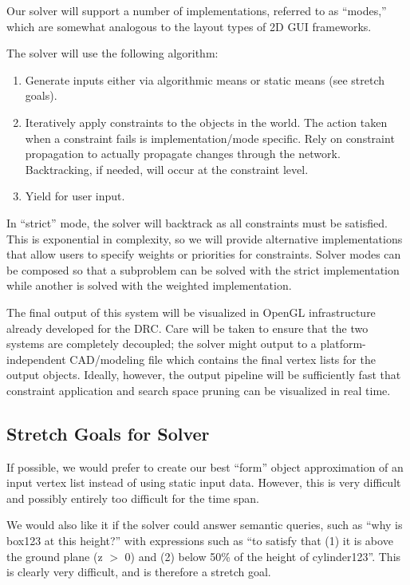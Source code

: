 \documentclass[a4paper,10pt]{article}
\begin{document}
Our solver will support a number of implementations, referred to as “modes,” 
which are somewhat analogous to the layout types of 2D GUI frameworks.

The solver will use the following algorithm:
\begin{enumerate}
 \item Generate inputs either via algorithmic means or static means (see 
stretch goals).
 \item Iteratively apply constraints to the objects in the world. The 
action taken when a constraint fails is implementation/mode specific.  Rely on 
constraint propagation to actually propagate changes through the network.  
Backtracking, if needed, will occur at the constraint level.
 \item Yield for user input.
\end{enumerate}

In “strict” mode, the solver will backtrack as all constraints must be 
satisfied. This is exponential in complexity, so we will provide alternative 
implementations that allow users to specify weights or priorities for 
constraints. Solver modes can be composed so that a subproblem can be solved 
with the strict implementation while another is solved with the weighted 
implementation. 

The final output of this system will be visualized in OpenGL infrastructure 
already developed for the DRC. Care will be taken to ensure that the two systems 
are completely decoupled; the solver might output to a platform-independent 
CAD/modeling file which contains the final vertex lists for the output objects. 
Ideally, however, the output pipeline will be sufficiently fast that constraint 
application and search space pruning can be visualized in real time.

\subsection{Stretch Goals for Solver}
If possible, we would prefer to create our best ``form'' object approximation 
of an input vertex list instead of using static input data.  However, this is 
very difficult and possibly entirely too difficult for the time span.

We would also like it if the solver could answer semantic queries, such as 
``why is box123 at this height?'' with expressions such as ``to satisfy that (1) 
it is above the ground plane (z $>$ 0) and (2) below 50\% of the height of 
cylinder123''.  This is clearly very difficult, and is therefore a stretch goal.
\end{document}
